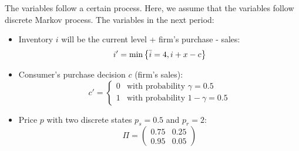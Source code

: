 \documentclass[12pt]{article}[margin=1in]
\begin{document}
The variables follow a certain process. Here, we assume that the variables
follow discrete Markov process. The variables in the next period:
\begin{itemize}
    \item Inventory $i$ will be the current level + firm's purchase - sales: \begin{equation*}
              i'=\min \left\{\bar{i}=4,i+x-c\right\}
          \end{equation*}
    \item Consumer's purchase decision $c$ (firm's sales):\begin{equation*}
              c'=\begin{cases}
                  0 & \text{with probability } \gamma = 0.5   \\
                  1 & \text{with probability } 1-\gamma = 0.5
              \end{cases}
          \end{equation*}
    \item Price $p$ with two discrete states $p_s=0.5$ and $p_r=2$: \begin{equation*}
              \Pi=\begin{pmatrix}
                  0.75 & 0.25 \\
                  0.95 & 0.05
              \end{pmatrix}
          \end{equation*}
\end{itemize}
\end{document}
